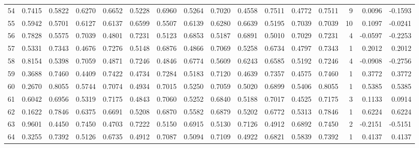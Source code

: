 \begin{tabular}{lrrrrrrrrrrrrrrr}
54  &      0.7415 &  0.5822 &  0.6270 &  0.6652 &  0.5228 &  0.6960 &  0.5264 &  0.7020 &  0.4558 &  0.7511 &   0.4772 &     0.7511 &      9 &                    0.0096 &                    -0.1593 \\
55  &      0.5942 &  0.5701 &  0.6127 &  0.6137 &  0.6599 &  0.5507 &  0.6139 &  0.6280 &  0.6639 &  0.5195 &   0.7039 &     0.7039 &     10 &                    0.1097 &                    -0.0241 \\
56  &      0.7828 &  0.5575 &  0.7039 &  0.4801 &  0.7231 &  0.5123 &  0.6853 &  0.5187 &  0.6891 &  0.5010 &   0.7029 &     0.7231 &      4 &                   -0.0597 &                    -0.2253 \\
57  &      0.5331 &  0.7343 &  0.4676 &  0.7276 &  0.5148 &  0.6876 &  0.4866 &  0.7069 &  0.5258 &  0.6734 &   0.4797 &     0.7343 &      1 &                    0.2012 &                     0.2012 \\
58  &      0.8154 &  0.5398 &  0.7059 &  0.4871 &  0.7246 &  0.4846 &  0.6774 &  0.5609 &  0.6243 &  0.6585 &   0.5192 &     0.7246 &      4 &                   -0.0908 &                    -0.2756 \\
59  &      0.3688 &  0.7460 &  0.4409 &  0.7422 &  0.4734 &  0.7284 &  0.5183 &  0.7120 &  0.4639 &  0.7357 &   0.4575 &     0.7460 &      1 &                    0.3772 &                     0.3772 \\
60  &      0.2670 &  0.8055 &  0.5744 &  0.7074 &  0.4934 &  0.7015 &  0.5250 &  0.7059 &  0.5020 &  0.6899 &   0.5406 &     0.8055 &      1 &                    0.5385 &                     0.5385 \\
61  &      0.6042 &  0.6956 &  0.5319 &  0.7175 &  0.4843 &  0.7060 &  0.5252 &  0.6840 &  0.5188 &  0.7017 &   0.4525 &     0.7175 &      3 &                    0.1133 &                     0.0914 \\
62  &      0.1622 &  0.7846 &  0.6375 &  0.6691 &  0.5208 &  0.6870 &  0.5582 &  0.6879 &  0.5202 &  0.6772 &   0.5313 &     0.7846 &      1 &                    0.6224 &                     0.6224 \\
63  &      0.9601 &  0.4450 &  0.7450 &  0.4703 &  0.7222 &  0.5150 &  0.6915 &  0.5130 &  0.7126 &  0.4912 &   0.6892 &     0.7450 &      2 &                   -0.2151 &                    -0.5151 \\
64  &      0.3255 &  0.7392 &  0.5126 &  0.6735 &  0.4912 &  0.7087 &  0.5094 &  0.7109 &  0.4922 &  0.6821 &   0.5839 &     0.7392 &      1 &                    0.4137 &                     0.4137 \\

\end{tabular}
